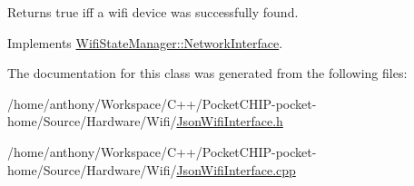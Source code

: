 \begin{DoxyReturn}{Returns}
true iff a wifi device was successfully found. 
\end{DoxyReturn}


Implements \mbox{\hyperlink{classWifiStateManager_1_1NetworkInterface_a0c2675d835715d956315d9e04e2667f9}{Wifi\+State\+Manager\+::\+Network\+Interface}}.



The documentation for this class was generated from the following files\+:\begin{DoxyCompactItemize}
\item 
/home/anthony/\+Workspace/\+C++/\+Pocket\+C\+H\+I\+P-\/pocket-\/home/\+Source/\+Hardware/\+Wifi/\mbox{\hyperlink{JsonWifiInterface_8h}{Json\+Wifi\+Interface.\+h}}\item 
/home/anthony/\+Workspace/\+C++/\+Pocket\+C\+H\+I\+P-\/pocket-\/home/\+Source/\+Hardware/\+Wifi/\mbox{\hyperlink{JsonWifiInterface_8cpp}{Json\+Wifi\+Interface.\+cpp}}\end{DoxyCompactItemize}
